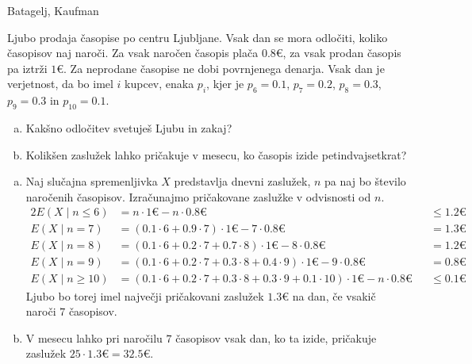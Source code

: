 \begin{naloga}{Batagelj, Kaufman}{\cite[Naloga~4.3]{bk}}
\begin{vprasanje}
Ljubo prodaja časopise po centru Ljubljane.
Vsak dan se mora odločiti, koliko časopisov naj naroči.
Za vsak naročen časopis plača $0.8 €$,
za vsak prodan časopis pa iztrži $1 €$.
Za neprodane časopise ne dobi povrnjenega denarja.
Vsak dan je verjetnost, da bo imel $i$ kupcev, enaka $p_i$,
kjer je $p_6 = 0.1$, $p_7 = 0.2$, $p_8 = 0.3$, $p_9 = 0.3$ in $p_{10} = 0.1$.
\begin{enumerate}[(a)]
\item Kakšno odločitev svetuješ Ljubu in zakaj?
\item Kolikšen zaslužek lahko pričakuje v mesecu,
ko časopis izide petindvajsetkrat?
\end{enumerate}
\end{vprasanje}

\begin{odgovor}
\begin{enumerate}[(a)]
\item Naj slučajna spremenljivka $X$ predstavlja dnevni zaslužek,
$n$ pa naj bo število naročenih časopisov.
Izračunajmo pričakovane zaslužke v odvisnosti od $n$.
\begin{alignat*}{2}
E(X \mid n \le 6) &= n \cdot 1 € - n \cdot 0.8 € &&\le 1.2 € \\
E(X \mid n = 7) &= (0.1 \cdot 6 + 0.9 \cdot 7) \cdot 1 €
    - 7 \cdot 0.8 € &&= 1.3 € \\
E(X \mid n = 8) &= (0.1 \cdot 6 + 0.2 \cdot 7 + 0.7 \cdot 8) \cdot 1 €
    - 8 \cdot 0.8 € &&= 1.2 € \\
E(X \mid n = 9) &= (0.1 \cdot 6 + 0.2 \cdot 7 + 0.3 \cdot 8 + 0.4 \cdot 9)
    \cdot 1 € - 9 \cdot 0.8 € &&= 0.8 € \\
E(X \mid n \ge 10) &= (0.1 \cdot 6 + 0.2 \cdot 7 + 0.3 \cdot 8 + 0.3 \cdot 9
    + 0.1 \cdot 10) \cdot 1 € - n \cdot 0.8 € &&\le 0.1 €
\end{alignat*}
Ljubo bo torej imel največji pričakovani zaslužek $1.3 €$ na dan,
če vsakič naroči $7$ časopisov.

\item V mesecu lahko pri naročilu $7$ časopisov vsak dan, ko ta izide,
pričakuje zaslužek $25 \cdot 1.3 € = 32.5 €$.
\end{enumerate}
\end{odgovor}
\end{naloga}

